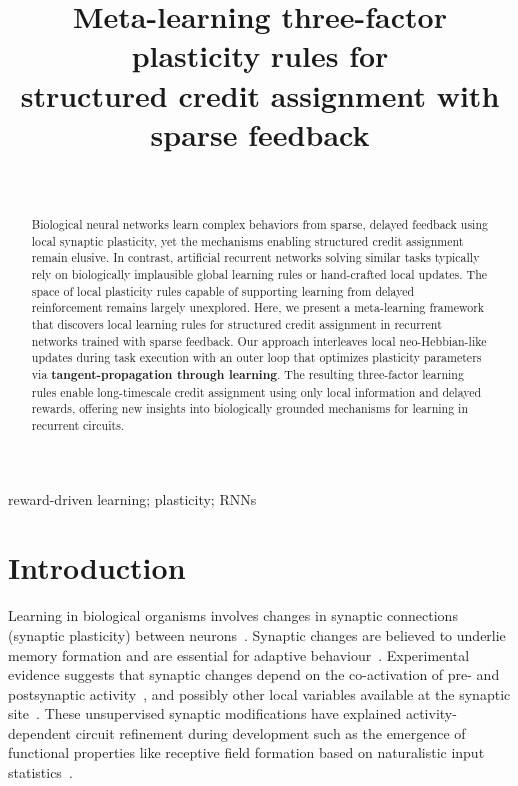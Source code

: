 \documentclass[mlabstract]{jmlr}
\title[Meta-learning three-factor rules]{Meta-learning three-factor plasticity rules for\\ structured credit assignment with sparse feedback 
}
\author{\Name{Dimitra Maoutsa} \Email{dimitra.maoutsa@gmail.com}\\
  }
\begin{document}
\maketitle

\begin{abstract}
Biological neural networks learn complex behaviors from sparse, delayed feedback using local synaptic plasticity, yet the mechanisms enabling structured credit assignment remain elusive. In contrast, artificial recurrent networks solving similar tasks typically rely on biologically implausible global learning rules or hand-crafted local updates. The space of local plasticity rules capable of supporting learning from delayed reinforcement remains largely unexplored. Here, we present a meta-learning framework that discovers local learning rules for structured credit assignment in recurrent networks trained with sparse feedback. Our approach interleaves local neo-Hebbian-like updates during task execution with an outer loop that optimizes plasticity parameters via \textbf{tangent-propagation through learning}. The resulting three-factor learning rules enable long-timescale credit assignment using only local information and delayed rewards, offering new insights into biologically grounded mechanisms for learning in recurrent circuits.
\end{abstract}
\begin{keywords}
reward-driven learning; plasticity; RNNs
\end{keywords}

\section{Introduction}
\label{sec:intro}


Learning in biological organisms involves changes in synaptic connections (synaptic plasticity) between neurons~\citep{bailey1993structural, mayford2012synapses}. Synaptic changes are believed to underlie memory formation and are essential for adaptive behaviour~\citep{hopfield1982neural}. Experimental evidence suggests that synaptic changes depend on the co-activation of pre- and postsynaptic activity~\citep{bi1998synaptic, sjostrom2001rate}, and possibly other local variables available at the synaptic site~\citep{graupner2012calcium, pedrosa2020voltage}. These unsupervised synaptic modifications have explained activity-dependent circuit refinement during development such as the emergence of functional properties like receptive field formation based on naturalistic input statistics~\citep{martin2000synaptic,blais1997receptive,brito2016nonlinear,gutig2003learning,law1994formation}.
\end{document}
